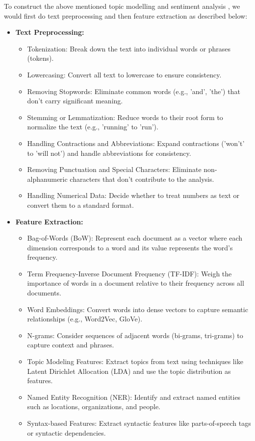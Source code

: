 \documentclass[11pt]{article} %
\begin{document}
To construct the above mentioned topic modelling and sentiment analysis , we would first do text preprocessing and then feature extraction as described below:

\begin{itemize}
\item \textbf{Text Preprocessing:}
\begin{itemize}[label={}, leftmargin=*]
    \item Tokenization: Break down the text into individual words or phrases (tokens).
    \item Lowercasing: Convert all text to lowercase to ensure consistency.
    \item Removing Stopwords: Eliminate common words (e.g., 'and', 'the') that don't carry significant meaning.
    \item Stemming or Lemmatization: Reduce words to their root form to normalize the text (e.g., 'running' to 'run').
    \item Handling Contractions and Abbreviations: Expand contractions ('won't' to 'will not') and handle abbreviations for consistency.
    \item Removing Punctuation and Special Characters: Eliminate non-alphanumeric characters that don't contribute to the analysis.
    \item Handling Numerical Data: Decide whether to treat numbers as text or convert them to a standard format.\\
\end{itemize}



\item \textbf{Feature Extraction:}
\begin{itemize}[label={}, leftmargin=*]
    \item Bag-of-Words (BoW): Represent each document as a vector where each dimension corresponds to a word and its value represents the word's frequency.
    \item Term Frequency-Inverse Document Frequency (TF-IDF): Weigh the importance of words in a document relative to their frequency across all documents.
    \item Word Embeddings: Convert words into dense vectors to capture semantic relationships (e.g., Word2Vec, GloVe).
    \item N-grams: Consider sequences of adjacent words (bi-grams, tri-grams) to capture context and phrases.
    \item Topic Modeling Features: Extract topics from text using techniques like Latent Dirichlet Allocation (LDA) and use the topic distribution as features.
    \item Named Entity Recognition (NER): Identify and extract named entities such as locations, organizations, and people.
    \item Syntax-based Features: Extract syntactic features like parts-of-speech tags or syntactic dependencies.
\end{itemize}


\end{itemize}
\end{document}
